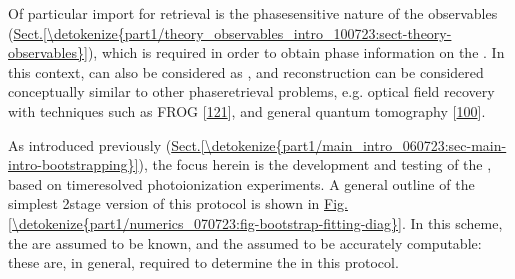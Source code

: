 \documentclass[letterpaper,table,10pt,english]{jupyterBook}
\begin{document}
\sphinxAtStartPar
Of particular import for {\hyperref[\detokenize{backmatter/glossary:term-radial-matrix-elements}]{}} retrieval is the phase\sphinxhyphen{}sensitive nature of the observables (\hyperref[\detokenize{part1/theory_observables_intro_100723:sect-theory-observables}]{Sect.\@ \ref{\detokenize{part1/theory_observables_intro_100723:sect-theory-observables}}}), which is required in order to obtain phase information on the {\hyperref[\detokenize{backmatter/glossary:term-partial-waves}]{}}. In this context, {\hyperref[\detokenize{backmatter/glossary:term-PADs}]{}} can also be considered as , and reconstruction can be considered conceptually similar to other phase\sphinxhyphen{}retrieval problems, e.g. optical field recovery with techniques such as FROG {[}\hyperlink{cite.backmatter/bibliography:id926}{121}{]}, and general quantum tomography {[}\hyperlink{cite.backmatter/bibliography:id780}{100}{]}.

\sphinxAtStartPar
As introduced previously (\hyperref[\detokenize{part1/main_intro_060723:sec-main-intro-bootstrapping}]{Sect.\@ \ref{\detokenize{part1/main_intro_060723:sec-main-intro-bootstrapping}}}), the focus herein is the development and testing of the , based on time\sphinxhyphen{}resolved {\hyperref[\detokenize{backmatter/glossary:term-RWP}]{}} photoionization experiments. A general outline of the simplest 2\sphinxhyphen{}stage version of this protocol is shown in \hyperref[\detokenize{part1/numerics_070723:fig-bootstrap-fitting-diag}]{Fig.\@ \ref{\detokenize{part1/numerics_070723:fig-bootstrap-fitting-diag}}}. In this scheme, the {\hyperref[\detokenize{backmatter/glossary:term-channel-functions}]{}} are assumed to be known, and the {\hyperref[\detokenize{backmatter/glossary:term-ADMs}]{}} assumed to be accurately computable: these are, in general, required to determine the {\hyperref[\detokenize{backmatter/glossary:term-radial-matrix-elements}]{}} in this protocol.
\end{document}
